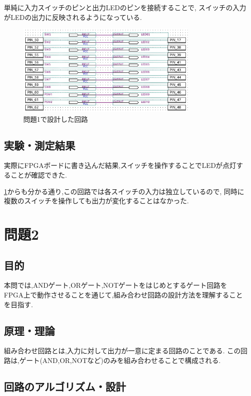 \documentclass[autodetect-engine, dvi=dvipdfmx, 10pt, a4paper, ja=standard]{bxjsarticle}
\begin{document}
単純に入力スイッチのピンと出力LEDのピンを接続することで,
スイッチの入力がLEDの出力に反映されるようになっている.


\begin{figure}[htbp]
	\centering
	\includegraphics[width=0.8\textwidth]{asset/ex1-トリミング.jpg}
	\caption{問題1で設計した回路}
	\label{fig:ex1}
\end{figure}


\subsection{実験・測定結果}

実際にFPGAボードに書き込んだ結果,スイッチを操作することでLEDが点灯することが確認できた.

\ref{fig:ex1}からも分かる通り,この回路では各スイッチの入力は独立しているので,
同時に複数のスイッチを操作しても出力が変化することはなかった.

\section{問題2}

\subsection{目的}

本問では,ANDゲート,ORゲート,NOTゲートをはじめとするゲート回路を
FPGA上で動作させることを通じて,組み合わせ回路の設計方法を理解することを目指す.

\subsection{原理・理論}

組み合わせ回路とは,入力に対して出力が一意に定まる回路のことである.
この回路は,ゲート(AND,OR,NOTなど)のみを組み合わせることで構成される.


\subsection{回路のアルゴリズム・設計}
\label{sec:ex2-design}
\end{document}
